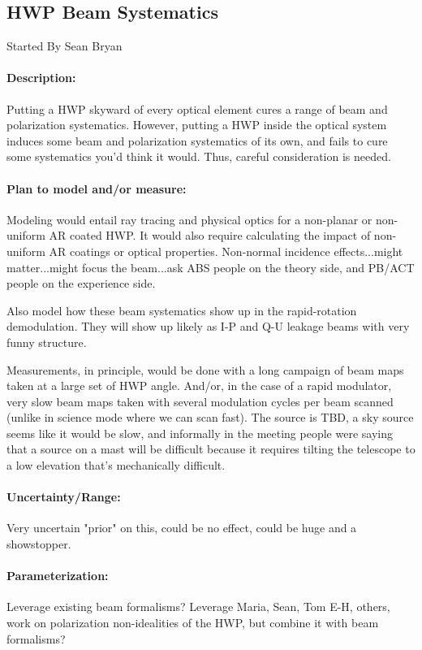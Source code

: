 
\subsection{HWP Beam Systematics}

Started By Sean Bryan

\paragraph{Description:}
Putting a HWP skyward of every optical element cures a range of beam and polarization systematics. However, putting a HWP inside the optical system induces some beam and polarization systematics of its own, and fails to cure some systematics you'd think it would. Thus, careful consideration is needed.

\paragraph{Plan to model and/or measure:}
Modeling would entail ray tracing and physical optics for a non-planar or non-uniform AR coated HWP. It would also require calculating the impact of non-uniform AR coatings or optical properties. Non-normal incidence effects...might matter...might focus the beam...ask ABS people on the theory side, and PB/ACT people on the experience side.

Also model how these beam systematics show up in the rapid-rotation demodulation. They will show up likely as I-P and Q-U leakage beams with very funny structure.

Measurements, in principle, would be done with a long campaign of beam maps taken at a large set of HWP angle. And/or, in the case of a rapid modulator, very slow beam maps taken with several modulation cycles per beam scanned (unlike in science mode where we can scan fast). The source is TBD, a sky source seems like it would be slow, and informally in the meeting people were saying that a source on a mast will be difficult because it requires tilting the telescope to a low elevation that's mechanically difficult.

\paragraph{Uncertainty/Range:}
Very uncertain "prior" on this, could be no effect, could be huge and a showstopper.

\paragraph{Parameterization:}

Leverage existing beam formalisms? Leverage Maria, Sean, Tom E-H, others, work on polarization non-idealities of the HWP, but combine it with beam formalisms?
